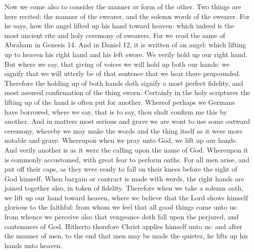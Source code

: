Now we come also to consider the manner or form of the other. Two things are here recited: the manner of the swearer, and the solemn words of the swearer. For he says, how the angel lifted up his hand toward heaven: which indeed is the most ancient rite and holy ceremony of swearers. For we read the same of Abraham in Genesis 14. And in Daniel 12, it is written of an angel: which lifting up to heaven his right hand and his left swore. We verily hold up our right hand. But where we say, that giving of voices we will hold up both our hands: we signify that we will utterly be of that sentence that we hear there propounded. Therefore the holding up of both hands doth signify a most perfect fidelity, and most assured confirmation of the thing sworn. Certainly in the holy scriptures the lifting up of the hand is often put for another. Whereof perhaps we Germans have borrowed, where we say, that is to say, thou shalt confirm me this by another. And in matters most serious and grave we are wont to use some outward ceremony, whereby we may make the words and the thing itself as it were more notable and grave. Whereupon when we pray unto God, we lift up our hands. And verily another is as it were the calling upon the name of God. Whereupon it is commonly accustomed, with great fear to perform oaths. For all men arise, and put off their caps, as they were ready to fall on their knees before the sight of God himself. When bargain or contract is made with words, the right hands are joined together also, in token of fidelity. Therefore when we take a solemn oath, we lift up our hand toward heaven, where we believe that the Lord shows himself glorious to the faithful: from whom we feel that all good things come unto us: from whence we perceive also that vengeance doth fall upon the perjured, and contemners of God. Hitherto therefore Christ applies himself unto us: and after the manner of men, to the end that men may be made the quieter, he lifts up his hands unto heaven.

